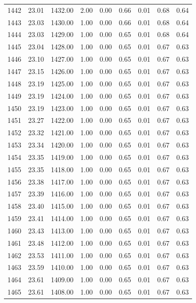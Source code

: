 \documentclass{article}\usepackage[]{graphicx}\usepackage[]{color}
\begin{document}
\begin{longtable}{rrrrrrrrr}
  1442 & 23.01 & 1432.00 & 2.00 & 0.00 & 0.66 & 0.01 & 0.68 & 0.64 \\ 
  1443 & 23.03 & 1430.00 & 1.00 & 0.00 & 0.66 & 0.01 & 0.68 & 0.64 \\ 
  1444 & 23.03 & 1429.00 & 1.00 & 0.00 & 0.65 & 0.01 & 0.68 & 0.64 \\ 
  1445 & 23.04 & 1428.00 & 1.00 & 0.00 & 0.65 & 0.01 & 0.67 & 0.63 \\ 
  1446 & 23.10 & 1427.00 & 1.00 & 0.00 & 0.65 & 0.01 & 0.67 & 0.63 \\ 
  1447 & 23.15 & 1426.00 & 1.00 & 0.00 & 0.65 & 0.01 & 0.67 & 0.63 \\ 
  1448 & 23.19 & 1425.00 & 1.00 & 0.00 & 0.65 & 0.01 & 0.67 & 0.63 \\ 
  1449 & 23.19 & 1424.00 & 1.00 & 0.00 & 0.65 & 0.01 & 0.67 & 0.63 \\ 
  1450 & 23.19 & 1423.00 & 1.00 & 0.00 & 0.65 & 0.01 & 0.67 & 0.63 \\ 
  1451 & 23.27 & 1422.00 & 1.00 & 0.00 & 0.65 & 0.01 & 0.67 & 0.63 \\ 
  1452 & 23.32 & 1421.00 & 1.00 & 0.00 & 0.65 & 0.01 & 0.67 & 0.63 \\ 
  1453 & 23.34 & 1420.00 & 1.00 & 0.00 & 0.65 & 0.01 & 0.67 & 0.63 \\ 
  1454 & 23.35 & 1419.00 & 1.00 & 0.00 & 0.65 & 0.01 & 0.67 & 0.63 \\ 
  1455 & 23.35 & 1418.00 & 1.00 & 0.00 & 0.65 & 0.01 & 0.67 & 0.63 \\ 
  1456 & 23.38 & 1417.00 & 1.00 & 0.00 & 0.65 & 0.01 & 0.67 & 0.63 \\ 
  1457 & 23.39 & 1416.00 & 1.00 & 0.00 & 0.65 & 0.01 & 0.67 & 0.63 \\ 
  1458 & 23.40 & 1415.00 & 1.00 & 0.00 & 0.65 & 0.01 & 0.67 & 0.63 \\ 
  1459 & 23.41 & 1414.00 & 1.00 & 0.00 & 0.65 & 0.01 & 0.67 & 0.63 \\ 
  1460 & 23.43 & 1413.00 & 1.00 & 0.00 & 0.65 & 0.01 & 0.67 & 0.63 \\ 
  1461 & 23.48 & 1412.00 & 1.00 & 0.00 & 0.65 & 0.01 & 0.67 & 0.63 \\ 
  1462 & 23.53 & 1411.00 & 1.00 & 0.00 & 0.65 & 0.01 & 0.67 & 0.63 \\ 
  1463 & 23.59 & 1410.00 & 1.00 & 0.00 & 0.65 & 0.01 & 0.67 & 0.63 \\ 
  1464 & 23.61 & 1409.00 & 1.00 & 0.00 & 0.65 & 0.01 & 0.67 & 0.63 \\ 
  1465 & 23.61 & 1408.00 & 1.00 & 0.00 & 0.65 & 0.01 & 0.67 & 0.63 \\ 

\end{longtable}
\end{document}
